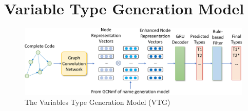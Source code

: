 \section{Variable Type Generation Model}
\label{sec:type-gen}

\begin{figure}[ht]
	\begin{center}
	  \includegraphics[width=5.7in]{figures/type-gen-model}
          \vspace{-6pt}
		\caption{The Variables Type Generation Model (VTG)}
		\label{fig:type-gen}
	\end{center}
\end{figure}
